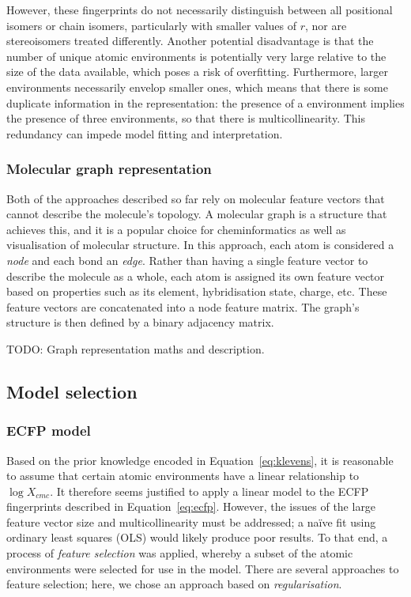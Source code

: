 However, these fingerprints do not necessarily distinguish between all
positional isomers or chain isomers, particularly with smaller values of $r$,
nor are stereoisomers treated differently. Another potential disadvantage is
that the number of unique atomic environments is potentially very large relative
to the size of the data available, which poses a risk of overfitting.
Furthermore, larger environments necessarily envelop smaller ones, which means
that there is some duplicate information in the representation: the presence of
a  environment implies the presence of three  environments,
so that there is multicollinearity. This redundancy can impede model fitting and
interpretation.

\subsubsection{Molecular graph representation}

Both of the approaches described so far rely on molecular feature vectors that
cannot describe the molecule's topology. A molecular graph is a structure that
achieves this, and it is a popular choice for cheminformatics as well as
visualisation of molecular structure. In this approach, each atom is considered
a \emph{node} and each bond an \emph{edge}. Rather than having a single feature
vector to describe the molecule as a whole, each atom is assigned its own
feature vector based on properties such as its element, hybridisation state,
charge, etc. These feature vectors are concatenated into a node feature matrix.
The graph's structure is then defined by a binary adjacency matrix.

TODO: Graph representation maths and description.

\subsection{Model selection}

\subsubsection{ECFP model}

Based on the prior knowledge encoded in Equation~\ref{eq:klevens}, it is
reasonable to assume that certain atomic environments have a linear relationship
to $\log X_{cmc}$. It therefore seems justified to apply a linear model to the
ECFP fingerprints described in Equation~\ref{eq:ecfp}. However, the issues of
the large feature vector size and multicollinearity must be addressed; a na\"ive
fit using ordinary least squares (OLS) would likely produce poor results. To
that end, a process of \emph{feature selection} was applied, whereby a subset of
the atomic environments were selected for use in the model. There are several
approaches to feature selection\cite{liFeatureSelectionData2017}; here, we chose
an approach based on \emph{regularisation}.

